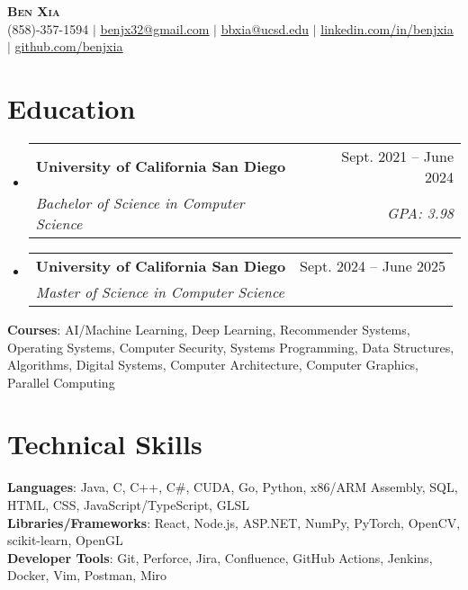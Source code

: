 \documentclass[letterpaper, 10pt]{article}
\makeatletter
\newcommand{\resumeSubheading}[4]{
  \vspace{4pt}\item
    \begin{tabular*}{0.97\textwidth}[t]{l@{\extracolsep{\fill}}r}
      \textbf{#1} & #2 \\
      \textit{#3} & \textit{\small #4} \\
    \end{tabular*}\vspace{-7pt}
}
\newcommand{\resumeSubHeadingListStart}{\begin{itemize}[leftmargin=0.15in, label={}]}
\newcommand{\resumeSubHeadingListEnd}{\end{itemize}}
\makeatother
\begin{document}

\begin{center}
  \textbf{\Huge \scshape Ben Xia} \uline{} \\ \vspace{1pt}
  \small (858)-357-1594 $|$
  \href{mailto:benjx32@gmail.com}{\uline{benjx32@gmail.com}} $|$
  \href{mailto:bbxia@ucsd.edu}{\uline{bbxia@ucsd.edu}} $|$
  \href{https://linkedin.com/in/benjxia}{\uline{linkedin.com/in/benjxia}} $|$
  \href{https://github.com/benjxia}{\uline{github.com/benjxia}}
\end{center}



\section{Education}
  \resumeSubHeadingListStart
  \resumeSubheading
      {University of California San Diego}{Sept. 2021 -- June 2024}
      {Bachelor of Science in Computer Science}{GPA: 3.98}
  \resumeSubheading
      {University of California San Diego}{Sept. 2024 -- June 2025}
      {Master of Science in Computer Science}{}
  \resumeSubHeadingListEnd
  \begin{itemize}[leftmargin=0.15in, label={}]
    \small{\item{
     \textbf{Courses}{: AI/Machine Learning, Deep Learning, Recommender Systems, Operating Systems, Computer Security, Systems Programming, Data Structures, Algorithms, Digital Systems, Computer Architecture, Computer Graphics, Parallel Computing } \\
    }}
 \end{itemize}

%
\section{Technical Skills}
 \begin{itemize}[leftmargin=0.15in, label={}]
    \small{\item{
     \textbf{Languages}{: Java, C, C++, C\#, CUDA, Go, Python, x86/ARM Assembly, SQL, HTML, CSS, JavaScript/TypeScript, GLSL } \\
     \textbf{Libraries/Frameworks}{: React, Node.js, ASP.NET, NumPy, PyTorch, OpenCV, scikit-learn, OpenGL} \\
     \textbf{Developer Tools}{: Git, Perforce, Jira, Confluence, GitHub Actions, Jenkins, Docker, Vim, Postman, Miro} \\
    }}
 \end{itemize}
\end{document}
